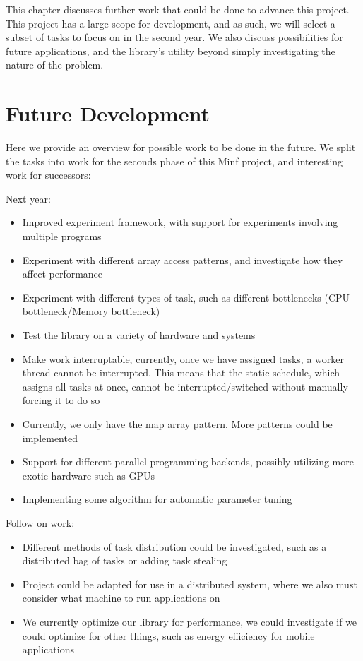 
This chapter discusses further work that could be done to advance this project. This project has a large scope for development, and as such, we will select a subset of tasks to focus on in the second year. We also discuss possibilities for future applications, and the library's
 utility beyond simply investigating the nature of the problem.



\section{Future Development}

Here we provide an overview for possible work to be done in the future. We split the tasks into work for the seconds phase of this Minf project, and interesting work for successors:

Next year:

\begin{itemize}
	\item Improved experiment framework, with support for experiments involving multiple programs
	\item Experiment with different array access patterns, and investigate how they affect performance
	\item Experiment with different types of task, such as different bottlenecks (CPU bottleneck/Memory bottleneck) 
	\item Test the library on a variety of hardware and systems
	\item Make work interruptable, currently, once we have assigned tasks, a worker thread cannot be interrupted. This means that the static schedule, which assigns all tasks at once, cannot be interrupted/switched without manually forcing it to do so
	\item Currently, we only have the map array pattern. More patterns could be implemented
	\item Support for different parallel programming backends, possibly utilizing more exotic hardware such as GPUs 
	\item Implementing some algorithm for automatic parameter tuning
\end{itemize}

Follow on work:

\begin{itemize}
	\item Different methods of task distribution could be investigated, such as a distributed bag of tasks or adding task stealing
	\item Project could be adapted for use in a distributed system, where we also must consider what machine to run applications on
	\item We currently optimize our library for performance, we could investigate if we could optimize for other things, such as energy efficiency for mobile applications
\end{itemize}

